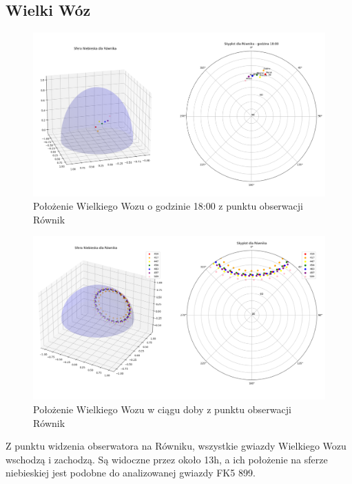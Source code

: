 \documentclass[fleqn,10pt,a4paper]{article}
\begin{document}
\subsection{Wielki Wóz}

\begin{figure}[h!]
  \centering
  \includegraphics[width=1\textwidth]{zdjecia/wielkiwoz18_r.png}
  \caption{Położenie Wielkiego Wozu o godzinie 18:00 z punktu obserwacji Równik}
  \label{wielkiwoz_r18}
\end{figure}

\begin{figure}[h!]
  \centering
  \includegraphics[width=1\textwidth]{zdjecia/wielkiwoz_r.png}
  \caption{Położenie Wielkiego Wozu w ciągu doby z punktu obserwacji Równik}
  \label{wielkiwoz_r}
\end{figure}

Z punktu widzenia obserwatora na Równiku, wszystkie gwiazdy Wielkiego Wozu wschodzą i zachodzą. Są widoczne
przez około 13h, a ich położenie na sferze niebieskiej jest podobne do analizowanej gwiazdy FK5 899.

\clearpage
\newpage
\end{document}
